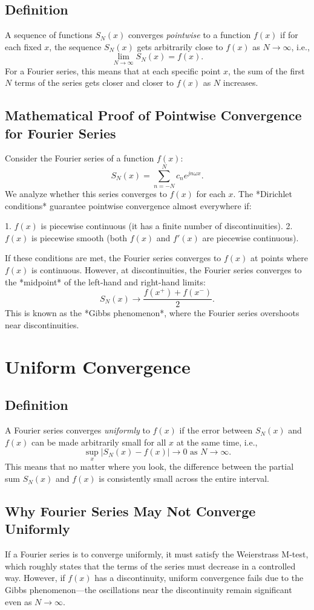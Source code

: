\subsection{Definition}
A sequence of functions $S_N(x)$ converges \textit{pointwise} to a function $f(x)$ if for each fixed $x$, the sequence $S_N(x)$ gets arbitrarily close to $f(x)$ as $N \to \infty$, i.e.,
\[
\lim_{N \to \infty} S_N(x) = f(x).
\]
For a Fourier series, this means that at each specific point $x$, the sum of the first $N$ terms of the series gets closer and closer to $f(x)$ as $N$ increases.

\subsection{Mathematical Proof of Pointwise Convergence for Fourier Series}
Consider the Fourier series of a function $f(x)$:
\[
S_N(x) = \sum_{n=-N}^{N} c_n e^{j n \omega x}.
\]
We analyze whether this series converges to $f(x)$ for each $x$. The *Dirichlet conditions* guarantee pointwise convergence almost everywhere if:

1. $f(x)$ is piecewise continuous (it has a finite number of discontinuities).
2. $f(x)$ is piecewise smooth (both $f(x)$ and $f'(x)$ are piecewise continuous).

If these conditions are met, the Fourier series converges to $f(x)$ at points where $f(x)$ is continuous. However, at discontinuities, the Fourier series converges to the *midpoint* of the left-hand and right-hand limits:
\[
S_N(x) \to \frac{f(x^+) + f(x^-)}{2}.
\]
This is known as the *Gibbs phenomenon*, where the Fourier series overshoots near discontinuities.

\section{Uniform Convergence}
\subsection{Definition}
A Fourier series converges \textit{uniformly} to $f(x)$ if the error between $S_N(x)$ and $f(x)$ can be made arbitrarily small for all $x$ at the same time, i.e.,
\[
\sup_{x} |S_N(x) - f(x)| \to 0 \text{ as } N \to \infty.
\]
This means that no matter where you look, the difference between the partial sum $S_N(x)$ and $f(x)$ is consistently small across the entire interval.

\subsection{Why Fourier Series May Not Converge Uniformly}
If a Fourier series is to converge uniformly, it must satisfy the Weierstrass M-test, which roughly states that the terms of the series must decrease in a controlled way. However, if $f(x)$ has a discontinuity, uniform convergence fails due to the Gibbs phenomenon—the oscillations near the discontinuity remain significant even as $N \to \infty$.

